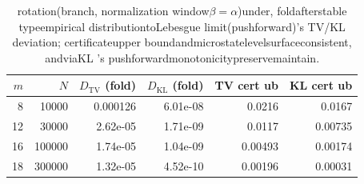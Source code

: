 \begin{table}[H]
\centering
\small
\begin{tabular}{rrrrrr}
\toprule
$m$ & $N$ & $D_{\mathrm{TV}}$ (fold) & $D_{\mathrm{KL}}$ (fold) & TV cert ub & KL cert ub\\
\midrule
8 & 10000 & 0.000126 & 6.01e-08 & 0.0216 & 0.0167\\
12 & 30000 & 2.62e-05 & 1.71e-09 & 0.0117 & 0.00735\\
16 & 100000 & 1.74e-05 & 1.04e-09 & 0.00493 & 0.00174\\
18 & 300000 & 1.32e-05 & 4.52e-10 & 0.00196 & 0.00031\\
\bottomrule
\end{tabular}
\caption{rotation(branch, normalization window$\beta=\alpha$)under, foldafterstable typeempirical distributiontoLebesgue limit(pushforward)'s  TV/KL deviation; certificateupper boundandmicrostatelevelsurfaceconsistent, andviaKL 's pushforwardmonotonicitypreservemaintain.}
\label{tab:rotation-folded-kl-certificate}
\end{table}
